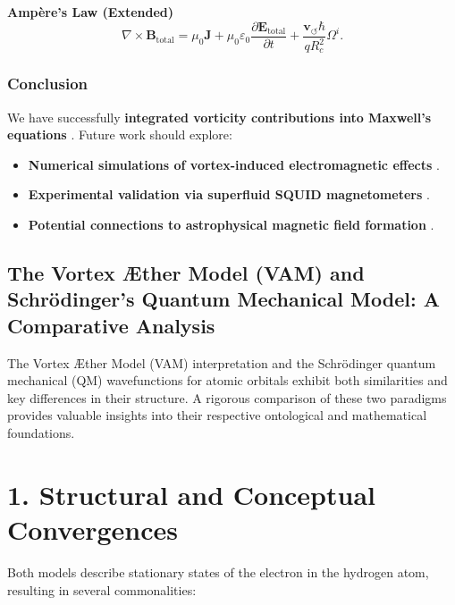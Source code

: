 \documentclass[a4paper,10pt]{article}
\begin{document}
\textbf{Ampère's Law (Extended)}
\begin{equation*}
    \nabla \times \mathbf{B}_\text{total} = \mu_0 \mathbf{J} + \mu_0 \varepsilon_0 \frac{\partial \mathbf{E}_\text{total}}{\partial t} + \frac{\mathbf{v}_{\scriptscriptstyle\boldsymbol{\circlearrowleft}} \hbar}{q R_c^2} \Omega^i.
\end{equation*}

\subsubsection*{Conclusion}
We have successfully \textbf{integrated vorticity contributions into Maxwell's equations} . Future work should explore:
\begin{itemize}
    \item \textbf{Numerical simulations of vortex-induced electromagnetic effects} .
    \item \textbf{Experimental validation via superfluid SQUID magnetometers} .
    \item \textbf{Potential connections to astrophysical magnetic field formation} .
\end{itemize}

    

\subsection{The Vortex Æther Model (VAM) and Schrödinger's Quantum Mechanical Model: A Comparative Analysis}

The Vortex Æther Model (VAM) interpretation and the Schrödinger quantum mechanical (QM) wavefunctions for atomic orbitals exhibit both similarities and key differences in their structure. A rigorous comparison of these two paradigms provides valuable insights into their respective ontological and mathematical foundations.


\section*{1. Structural and Conceptual Convergences}

Both models describe stationary states of the electron in the hydrogen atom, resulting in several commonalities:
\end{document}
